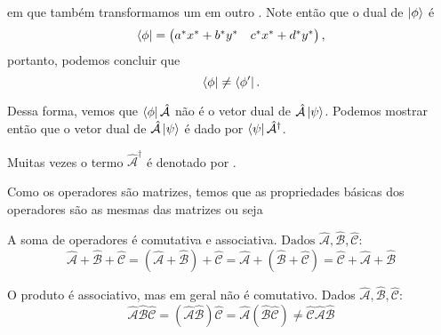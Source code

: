 \begin{example}
\begin{equation*}
            \end{equation*}
        em que também transformamos um  em outro . Note então que o dual de $\ket{\phi}$ é
            \begin{equation*}
                \bra{\phi} = 
                \begin{pmatrix}
                    a^{\ast}x^{\ast} + b^{\ast}y^{\ast} & c^{\ast}x^{\ast} + d^{\ast}y^{\ast}
                \end{pmatrix},
            \end{equation*}
        portanto, podemos concluir que
            \begin{equation*}
                \bra{\phi} \neq \bra{\phi'}.
            \end{equation*}
    \end{example}
    
    Dessa forma, vemos que $\bra{\phi}\hat{\mathcal{A}}$ não é o vetor dual de $\hat{\mathcal{A}}\ket{\psi}$. Podemos mostrar então que o vetor dual de $\hat{\mathcal{A}}\ket{\psi}$ é dado por $\bra{\psi}\hat{\mathcal{A}}^{\dagger}$.
    \begin{note}{}
        Muitas vezes o termo $\hat{\mathcal{A}}^{\dagger}$ é denotado por .
    \end{note}
    
    Como os operadores são matrizes, temos que as propriedades básicas dos operadores são as mesmas das matrizes ou seja
    \begin{myitemize}
        \item A soma de operadores é comutativa e associativa. $\textrm{Dados }\hat{\mathcal{A}}, \hat{\mathcal{B}}, \hat{\mathcal{C}}$:
            \begin{equation*}
                \hat{\mathcal{A}} + \hat{\mathcal{B}} + \hat{\mathcal{C}} = (\hat{\mathcal{A}} + \hat{\mathcal{B}}) + \hat{\mathcal{C}} = \hat{\mathcal{A}} + (\hat{\mathcal{B}} + \hat{\mathcal{C}}) = \hat{\mathcal{C}} + \hat{\mathcal{A}} + \hat{\mathcal{B}}
            \end{equation*}
        \item O produto é associativo, mas em geral não é comutativo. Dados $\hat{\mathcal{A}},\hat{\mathcal{B}},\hat{\mathcal{C}}$:
            \begin{equation*}
                \hat{\mathcal{A}}\hat{\mathcal{B}}\hat{\mathcal{C}} = (\hat{\mathcal{A}} \hat{\mathcal{B}}) \hat{\mathcal{C}} = \hat{\mathcal{A}} (\hat{\mathcal{B}} \hat{\mathcal{C}}) \neq \hat{\mathcal{C}} \hat{\mathcal{A}} \hat{\mathcal{B}}
            \end{equation*}
    \end{myitemize}
    
